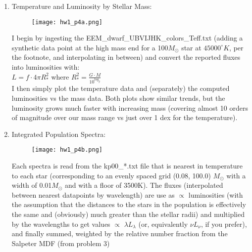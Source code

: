 \documentclass[11pt]{article}
\begin{document}
\begin{enumerate}
    \begin{enumerate}
  	  \item %
  	  Temperature and Luminosity by Stellar Mass:
  	  
		  \begin{figure}[H]
	  		\texttt{[image: hw1\_p4a.png]}
	  		\label{fig:fig7}
		  \end{figure}
		  
	I begin by ingesting the EEM\_dwarf\_UBVIJHK\_colors\_Teff.txt (adding a synthetic data point at the high mass end for a 100$M_{\odot}$ star at $45000^{\circ} K$, per the footnote, and interpolating in between) and convert the reported fluxes into luminosities with:\\
	
		 \hspace{10mm} $L = f \cdot 4\pi R_{*}^2$ \hspace{5mm} where $R_{*}^2 = \frac{\displaystyle G \cdot M} {\displaystyle 10^{log_g}}$\\
		 
	I then simply plot the temperature data and (separately) the computed luminosities vs the mass data. Both plots show similar trends, but the luminosity grows much faster with increasing mass (covering almost 10 orders of magnitude over our mass range vs just over 1 dex for the temperature).\\

\newpage 		  
		  
	\item %
	  	  Integrated Population Spectra:
	  	  
		  \begin{figure}[H]
			  		\texttt{[image: hw1\_p4b.png]}
			  		\label{fig:fig8}
		  \end{figure}
		  

	Each spectra is read from the kp00\_*.txt file that is nearest in temperature to each star (corresponding to an evenly spaced grid (0.08, 100.0) $M_{\odot}$ with a width of 0.01$M_{\odot}$ and with a floor of 3500K). The fluxes (interpolated between nearest datapoints by wavelength) are use as $\propto$ luminosities (with the assumption that the distances to the stars in the population is effectively the same and (obviously) much greater than the stellar radii) and multiplied by the wavelengths to get values $\propto$ $\lambda L_{\lambda}$ (or, equivalently $\nu L_{\nu}$, if you prefer), and finally summed, weighted by the relative number fraction from the Salpeter MDF (from problem 3)
	

\end{enumerate}
\end{enumerate}
\end{document}
